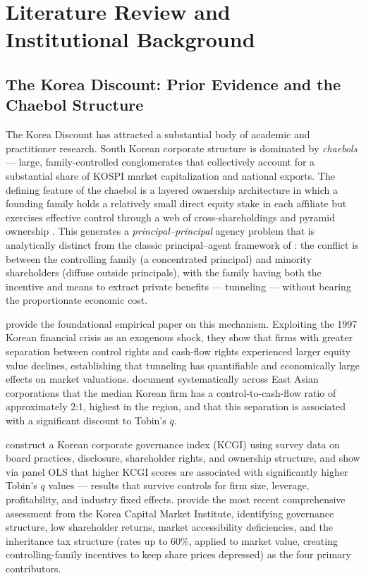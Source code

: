 \documentclass[12pt]{article}
\begin{document}
\section{Literature Review and Institutional Background}
\label{sec:litreview}

\subsection{The Korea Discount: Prior Evidence and the Chaebol Structure}

The Korea Discount has attracted a substantial body of academic and practitioner research.
South Korean corporate structure is dominated by \textit{chaebols} --- large, family-controlled
conglomerates that collectively account for a substantial share of KOSPI market capitalization
and national exports. The defining feature of the chaebol is a layered ownership architecture
in which a founding family holds a relatively small direct equity stake in each affiliate but
exercises effective control through a web of cross-shareholdings and pyramid ownership
\citep{claessens2000}. This generates a \textit{principal--principal} agency problem that is
analytically distinct from the classic principal--agent framework of \citet{jensen1976}: the
conflict is between the controlling family (a concentrated principal) and minority shareholders
(diffuse outside principals), with the family having both the incentive and means to extract
private benefits --- tunneling --- without bearing the proportionate economic cost.

\citet{baek2004} provide the foundational empirical paper on this mechanism. Exploiting the
1997 Korean financial crisis as an exogenous shock, they show that firms with greater
separation between control rights and cash-flow rights experienced larger equity value declines,
establishing that tunneling has quantifiable and economically large effects on market valuations.
\citet{claessens2000} document systematically across East Asian corporations that the median
Korean firm has a control-to-cash-flow ratio of approximately 2:1, highest in the region, and
that this separation is associated with a significant discount to Tobin's $q$.

\citet{black2006} construct a Korean corporate governance index (KCGI) using survey data on
board practices, disclosure, shareholder rights, and ownership structure, and show via panel
OLS that higher KCGI scores are associated with significantly higher Tobin's $q$ values ---
results that survive controls for firm size, leverage, profitability, and industry fixed
effects. \citet{kcmi2023} provide the most recent comprehensive assessment from the Korea
Capital Market Institute, identifying governance structure, low shareholder returns, market
accessibility deficiencies, and the inheritance tax structure (rates up to 60\%, applied to
market value, creating controlling-family incentives to keep share prices depressed) as the
four primary contributors.
\end{document}
